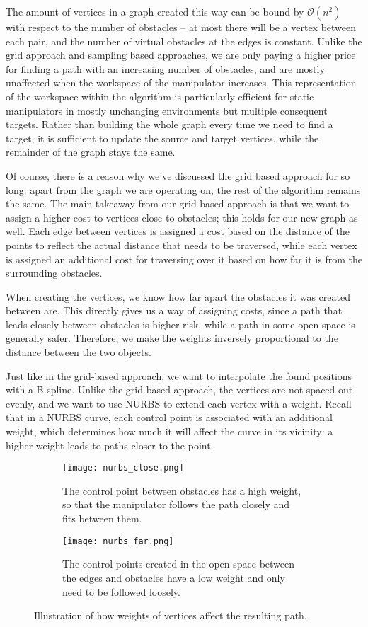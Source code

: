 The amount of vertices in a graph created this way can be bound by $\mathcal{O}(n^2)$ with respect to the number of obstacles -- at most there will be a vertex between each pair, and the number of virtual obstacles at the edges is constant. Unlike the grid approach and sampling based approaches, we are only paying a higher price for finding a path with an increasing number of obstacles, and are mostly unaffected when the workspace of the manipulator increases. This representation of the workspace within the algorithm is particularly efficient for static manipulators in mostly unchanging environments but multiple consequent targets. Rather than building the whole graph every time we need to find a target, it is sufficient to update the source and target vertices, while the remainder of the graph stays the same.

Of course, there is a reason why we've discussed the grid based approach for so long: apart from the graph we are operating on, the rest of the algorithm remains the same.
The main takeaway from our grid based approach is that we want to assign a higher cost to vertices close to obstacles; this holds for our new graph as well. Each edge between vertices is assigned a cost based on the distance of the points to reflect the actual distance that needs to be traversed, while each vertex is assigned an additional cost for traversing over it based on how far it is from the surrounding obstacles.

When creating the vertices, we know how far apart the obstacles it was created between are. This directly gives us a way of assigning costs, since a path that leads closely between obstacles is higher-risk, while a path in some open space is generally safer. Therefore, we make the weights inversely proportional to the distance between the two objects.

Just like in the grid-based approach, we want to interpolate the found positions with a B-spline. Unlike the grid-based approach, the vertices are not spaced out evenly, and we want to use NURBS to extend each vertex with a weight. Recall that in a NURBS curve, each control point is associated with an additional weight, which determines how much it will affect the curve in its vicinity: a higher weight leads to paths closer to the point.

\begin{figure}
  \centering
  \begin{subfigure}{.45\textwidth}
    \texttt{[image: nurbs\_close.png]}
    \caption{The control point between obstacles has a high weight, so that the manipulator follows the path closely and fits between them.}
  \end{subfigure}
  \begin{subfigure}{0.45\textwidth}
    \texttt{[image: nurbs\_far.png]}
    \caption{The control points created in the open space between the edges and obstacles have a low weight and only need to be followed loosely.}
  \end{subfigure}
  \caption{Illustration of how weights of vertices affect the resulting path.}\label{fig:nurb_paths}
\end{figure}


